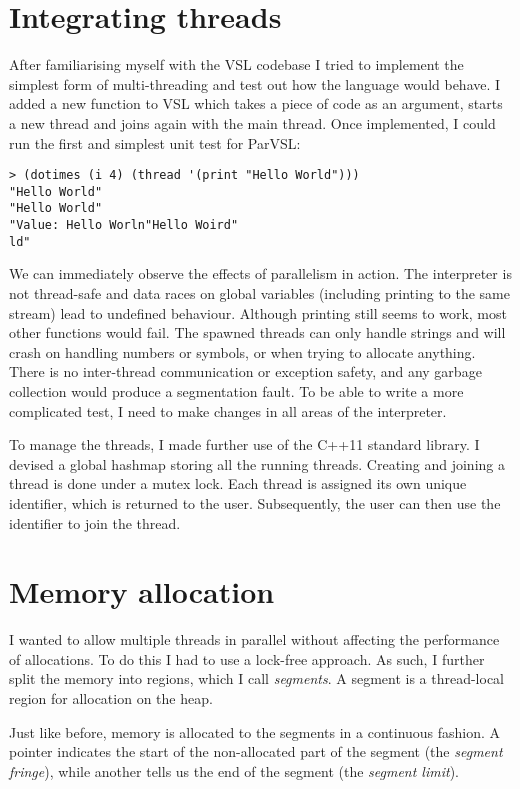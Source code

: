 \section{Integrating threads}
\label{sec:babythreads}
After familiarising myself with the VSL codebase I tried to implement the simplest form of
multi-threading and test out how the language would behave. I added a new function to VSL
which takes a piece of code as an argument, starts a new thread and joins again with
the main thread. Once implemented, I could run the first and simplest unit test for ParVSL:

\begin{verbatim}
> (dotimes (i 4) (thread '(print "Hello World")))
"Hello World"
"Hello World"
"Value: Hello Worln"Hello Woird"
ld"
\end{verbatim}

We can immediately observe the effects of parallelism in action. The interpreter is not thread-safe and data races
on global variables (including printing to the same stream) lead to undefined behaviour. Although printing
still seems to work, most other functions would fail. The spawned threads can only handle strings
and will crash on handling numbers or symbols, or when trying to allocate anything.
There is no inter-thread communication or exception safety, and any garbage collection would produce a segmentation
fault. To be able to write a more complicated test, I need to make changes in all areas of the interpreter.

To manage the threads, I made further use of the C++11 standard library. I devised a global hashmap storing
all the running threads. Creating and joining a thread is done under a mutex lock. Each thread is assigned its own unique
identifier, which is returned to the user. Subsequently, the user can then use the identifier to join the thread.

\section{Memory allocation}
\label{sec:malloc}
\label{sec:storage}

I wanted to allow multiple threads in parallel without affecting the performance
of allocations. To do this I had to use a lock-free approach. As such, I further
split the memory into regions, which I call \emph{segments}. A segment is a thread-local region
for allocation on the heap.

Just like before, memory is allocated to the segments in a continuous
fashion. A pointer indicates the start of the non-allocated part of the segment
(the \emph{segment fringe}), while another tells us the end of the segment
(the \emph{segment limit}).

